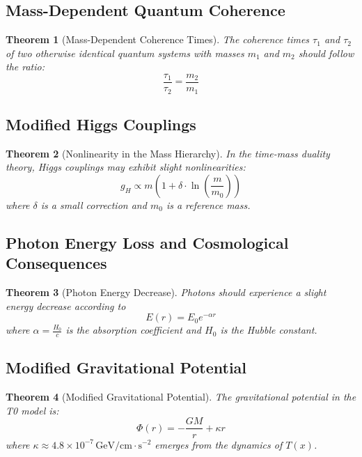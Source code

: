 \documentclass[a4paper,12pt]{article}
\newtheorem{theorem}{Theorem}[section]
\begin{document}
	\subsection{Mass-Dependent Quantum Coherence}
	
	\begin{theorem}[Mass-Dependent Coherence Times]
		The coherence times \( \tau_1 \) and \( \tau_2 \) of two otherwise identical quantum systems with masses \( m_1 \) and \( m_2 \) should follow the ratio:
		\begin{equation}
			\frac{\tau_1}{\tau_2} = \frac{m_2}{m_1}
		\end{equation}
	\end{theorem}
	
	\subsection{Modified Higgs Couplings}
	
	\begin{theorem}[Nonlinearity in the Mass Hierarchy]
		In the time-mass duality theory, Higgs couplings may exhibit slight nonlinearities:
		\begin{equation}
			g_H \propto m \left(1 + \delta \cdot \ln\left(\frac{m}{m_0}\right)\right)
		\end{equation}
		where \( \delta \) is a small correction and \( m_0 \) is a reference mass.
	\end{theorem}
	
	\subsection{Photon Energy Loss and Cosmological Consequences}
	
	\begin{theorem}[Photon Energy Decrease]
		Photons should experience a slight energy decrease according to
		\begin{equation}
			E(r) = E_0 e^{-\alpha r}
		\end{equation}
		where \( \alpha = \frac{H_0}{c} \) is the absorption coefficient and \( H_0 \) is the Hubble constant.
	\end{theorem}
	
	\subsection{Modified Gravitational Potential}
	
	\begin{theorem}[Modified Gravitational Potential]
		The gravitational potential in the T0 model is:
		\begin{equation}
			\Phi(r) = -\frac{G M}{r} + \kappa r
		\end{equation}
		where \( \kappa \approx 4.8 \times 10^{-7} \, \text{GeV/cm} \cdot \text{s}^{-2} \) emerges from the dynamics of \( T(x) \).
	\end{theorem}
	
\end{document}
